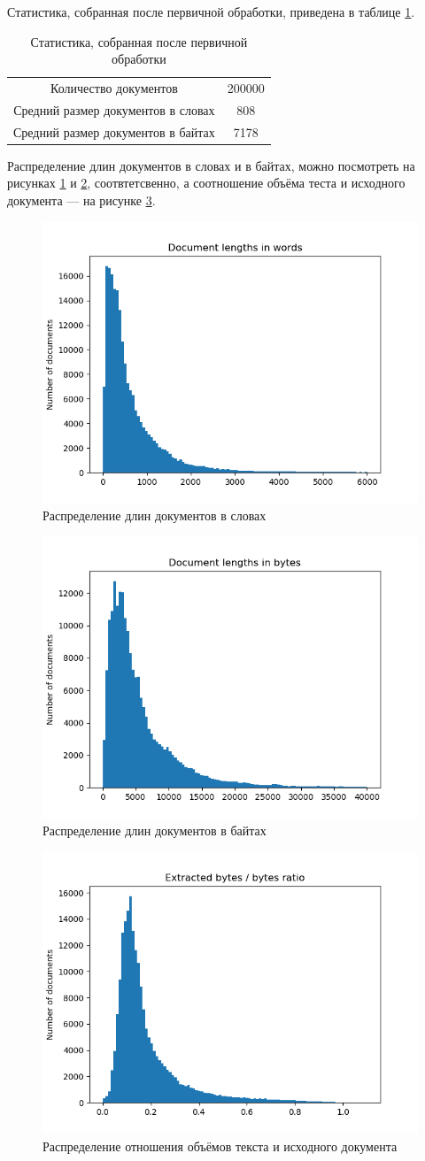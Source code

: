 Статистика, собранная после первичной обработки, приведена в таблице \ref{primary-stats}.

\begin{table}[h]
\begin{tabular}{|c|c|}
    \hline
        Количество документов                              & 200000 \\
        Средний размер документов в словах                 & 808 \\
        Средний размер документов в байтах                 & 7178 \\
    \hline
\end{tabular}
\caption{Статистика, собранная после первичной обработки}
\label{primary-stats}
\end{table}

Распределение длин документов в словах и в байтах, можно посмотреть на рисунках \ref{primary-length-w} и \ref{primary-length-b}, соотвтетсвенно, а соотношение объёма теста и исходного документа — на рисунке \ref{primary-volfraction}.

\begin{figure}[h]
    \includegraphics[width=.5\textwidth]{doc_words.png}
\caption{Распределение длин документов в словах}
\label{primary-length-w}
\end{figure}

\begin{figure}[h]
\includegraphics[width=.5\textwidth]{doc_lengths.png}
\caption{Распределение длин документов в байтах}
\label{primary-length-b}
\end{figure}

\begin{figure}[h]
\includegraphics[width=.5\textwidth]{doc_ratio.png}
\caption{Распределение отношения объёмов текста и исходного документа}
\label{primary-volfraction}
\end{figure}
